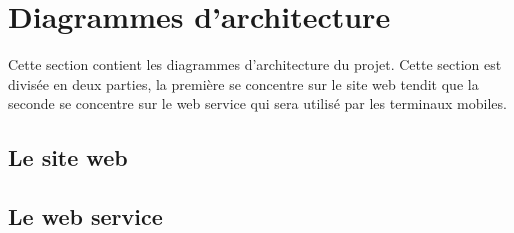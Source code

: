 \chapter{Diagrammes d'architecture}

Cette section contient les diagrammes d'architecture du projet. Cette section est divisée en deux parties, la première se concentre sur le site web tendit que la seconde se concentre sur le web service qui sera utilisé par les terminaux mobiles.

\newpage
\section{Le site web}

\newpage
\section{Le web service}
